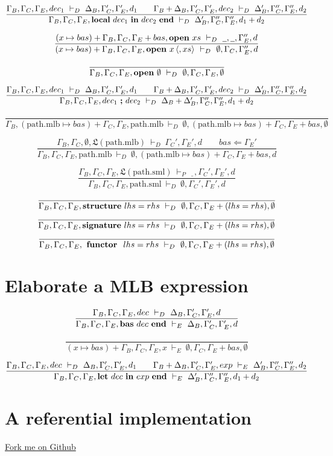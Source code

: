 \documentclass[11pt,a4paper]{article}
\newcommand{\keyword}[1]{\textrm{\textbf{#1}}}
\newcommand{\local}[2]{\keyword{local}\ #1\ \keyword{in}\ #2\ \keyword{end}}
\newcommand{\open}[1]{\keyword{open}\ #1}
\newcommand{\sequence}[2]{#1\ \keyword{;}\ #2}
\newcommand{\pathmlb}{\textrm{path.mlb}}
\newcommand{\pathsml}{\textrm{path.sml}}
\newcommand{\structure}{\keyword{structure}\ }
\newcommand{\signature}{\keyword{signature}\ }
\newcommand{\functor}  {\keyword{\ functor\ }\ }
\newcommand{\bas}[1]{\keyword{bas}\ #1\ \keyword{end}}
\newcommand{\lete}[2]{\keyword{let}\ #1\ \keyword{in}\ #2\ \keyword{end}}
\newcommand{\load}[1]{\mathfrak{L}(#1)}
\newcommand{\makebasis}[2]{ #1 \Leftarrow #2 }
\newcommand{\Binds}{\Gamma_B}
\newcommand{\BndAD}{\Delta_B}
\newcommand{\Cache}{\Gamma_C}
\newcommand{\Elabo}{\Gamma_E}
\newcommand{\Empty}{\emptyset}
\newcommand{\optional}[1]{\langle #1 \rangle}
\newcommand{\ElabDec}{\ \vdash_D\ }
\newcommand{\ElabExp}{\ \vdash_E\ }
\newcommand{\ElabProg}{\ \vdash_P\ }
\newcommand{\wildcard}{\underline{\phantom{2}}}
\begin{document}
\[
\dfrac{\Binds,\Cache,\Elabo,dec_1 \ElabDec \BndAD,\Cache',\Elabo',d_1 \qquad
       \Binds+\BndAD,\Cache',\Elabo',dec_2 \ElabDec \BndAD',\Cache'',\Elabo'',d_2}
      {\Binds,\Cache,\Elabo, \local{dec_1}{dec_2} \ElabDec \BndAD', \Cache'', \Elabo'', d_1+d_2}
\]

\[
\dfrac{(x\mapsto bas) + \Binds, \Cache, \Elabo + bas, \open{xs} \ElabDec \wildcard, \wildcard , \Elabo'', d}
      {(x\mapsto bas) + \Binds, \Cache, \Elabo, \open{x\,\optional{,xs}} \ElabDec \Empty, \Cache, \Elabo'', d}
\]

\[
\dfrac{ }
      { \Binds, \Cache, \Elabo, \open{\Empty} \ElabDec \Empty, \Cache, \Elabo, \Empty}
\]


\[
\dfrac{\Binds,\Cache,\Elabo,dec_1 \ElabDec \BndAD,\Cache',\Elabo',d_1 \qquad
       \Binds+\BndAD,\Cache',\Elabo',dec_2 \ElabDec \BndAD', \Cache'', \Elabo'', d_2}
      {\Binds,\Cache,\Elabo,\sequence{dec_1}{dec_2} \ElabDec \BndAD+\BndAD',\Cache'',\Elabo'',d_1+d_2}
\]

\[
\dfrac{}
      {\Binds, (\pathmlb \mapsto bas) + \Cache, \Elabo, \pathmlb \ElabDec \Empty, (\pathmlb \mapsto bas) + \Cache, \Elabo + bas, \Empty}
\]

\[
\dfrac{\Binds,\Cache,\Empty,\load{\pathmlb} \ElabDec \Cache',\Elabo',d \qquad
       \makebasis{bas}{\Elabo'}}
      {\Binds, \Cache, \Elabo, \pathmlb \ElabDec \Empty, (\pathmlb \mapsto bas) + \Cache, \Elabo + bas, d}
\]

\[
\dfrac{\Binds, \Cache, \Elabo, \load{\pathsml} \ElabProg \wildcard, \Cache', \Elabo', d
      }
      {\Binds, \Cache, \Elabo, \pathsml \ElabDec \Empty, \Cache', \Elabo', d}
\]

\[
\dfrac{}
      {\Binds,\Cache,\Elabo, \structure{lhs=rhs} \ElabDec \Empty,\Cache,\Elabo +(lhs=rhs),\Empty}
\]
\[
\dfrac{}
      {\Binds,\Cache,\Elabo, \signature{lhs=rhs} \ElabDec \Empty,\Cache,\Elabo +(lhs=rhs),\Empty}
\]
\[
\dfrac{}
      {\Binds,\Cache,\Elabo, \functor{lhs=rhs} \ElabDec \Empty,\Cache,\Elabo +(lhs=rhs),\Empty}
\]

\section{Elaborate a MLB expression}

\[
\dfrac{\Binds,\Cache,\Elabo,dec \ElabDec \BndAD, \Cache', \Elabo', d}
      {\Binds,\Cache,\Elabo,\bas{dec} \ElabExp \BndAD, \Cache', \Elabo', d}
\]

\[
\dfrac{}
      {(x \mapsto bas) + \Binds,\Cache,\Elabo,x \ElabExp \Empty, \Cache, \Elabo + bas, \Empty}
\]

\[
\dfrac{\Binds,\Cache,\Elabo,dec \ElabDec \BndAD, \Cache', \Elabo', d_1 \qquad
       \Binds+\BndAD,\Cache',\Elabo',exp \ElabExp \BndAD', \Cache'',\Elabo'', d_2}
      {\Binds,\Cache,\Elabo,\lete{dec}{exp} \ElabExp \BndAD', \Cache'', \Elabo'', d_1 + d_2}
\]

\section {A referential implementation}
\href{https://github.com/pierric/mlton}{Fork me on Github}
\end{document}
